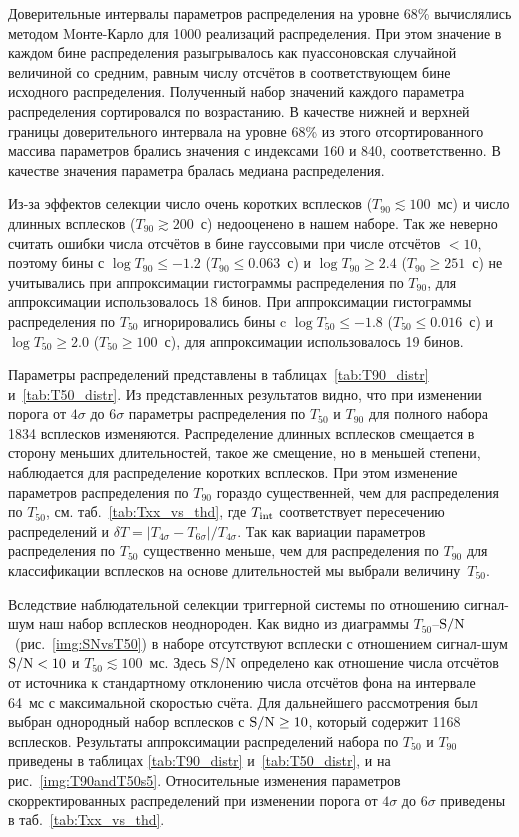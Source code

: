 Доверительные интервалы параметров распределения на уровне 68\% вычислялись 
методом Mонте-Карло для 1000 реализаций распределения. При этом значение в каждом 
бине распределения разыгрывалось как пуассоновская случайной величиной со средним, равным 
числу отсчётов в соответствующем бине исходного распределения. Полученный набор 
значений каждого параметра распределения сортировался по возрастанию. В качестве нижней и верхней 
границы доверительного интервала на уровне 68\% из этого отсортированного массива 
параметров брались значения с индексами 160 и 840, соответственно. 
В качестве значения параметра бралась медиана распределения.

Из-за эффектов селекции число очень коротких всплесков ($T_{90} \lesssim 100$~мс) и 
число длинных всплесков ($T_{90} \gtrsim 200$~с) недооценено в нашем наборе. Так же неверно 
считать ошибки числа отсчётов в бине гауссовыми при числе отсчётов $<10$, поэтому 
бины с $\log T_{90} \leq -1.2$ ($T_{90} \leq 0.063$~с) и $\log T_{90} \geq 2.4$ ($T_{90} \geq 251$~с) 
не учитывались при аппроксимации гистограммы распределения по $T_{90}$,  для аппроксимации 
использовалось 18 бинов. При аппроксимации гистограммы распределения по $T_{50}$ игнорировались 
бины c $\log T_{50} \leq -1.8$ ($T_{50} \leq 0.016$~с) и  $\log T_{50} \geq 2.0$ 
($T_{50} \geq 100$~с), для аппроксимации использовалось 19 бинов.

Параметры распределений представлены в таблицах~\ref{tab:T90_distr} и~\ref{tab:T50_distr}. 
Из представленных результатов видно, что при изменении порога от $4\sigma$ до $6\sigma$ 
параметры распределения по $T_{50}$ и $T_{90}$ для полного набора 1834 всплесков изменяются. 
Распределение длинных всплесков смещается в сторону меньших длительностей, такое же смещение, 
но в меньшей степени, наблюдается для распределение коротких всплесков. 
При этом изменение параметров распределения по $T_{90}$ гораздо существенней, 
чем для распределения по $T_{50}$, см. таб.~\ref{tab:Txx_vs_thd},
где $T_{{\mathrm{int}}}$ соответствует пересечению распределений и 
$\delta T =|T_{4\sigma}-T_{6\sigma}| / T_{4\sigma}$. 
Так как вариации параметров распределения по $T_{50}$ существенно меньше, 
чем для распределения по $T_{90}$ для классификации всплесков на основе длительностей 
мы выбрали величину~$T_{50}$. 



Вследствие наблюдательной селекции триггерной системы по отношению сигнал-шум 
наш набор всплесков неоднороден. Как видно из диаграммы $T_{50}$--${\mathrm{S/N}}$~(рис.~\ref{img:SNvsT50}) 
в наборе отсутствуют всплески с отношением сигнал-шум ${\mathrm{S/N}} < 10$ и $T_{50} \lesssim 100$~мс. 
Здесь S/N определено как отношение числа отсчётов от источника к стандартному отклонению 
числа отсчётов фона на интервале 64~мс с максимальной скоростью счёта. 
Для дальнейшего рассмотрения был выбран однородный набор всплесков с ${\mathrm{S/N}}\geq 10$, 
который содержит 1168 всплесков. 
Результаты аппроксимации распределений набора по $T_{50}$ и $T_{90}$ приведены в 
таблицах \ref{tab:T90_distr} и~\ref{tab:T50_distr}, и на рис.~\ref{img:T90andT50s5}. 
Относительные изменения параметров скорректированных распределений при изменении 
порога от $4\sigma$ до $6\sigma$ приведены в таб.~\ref{tab:Txx_vs_thd}. 

